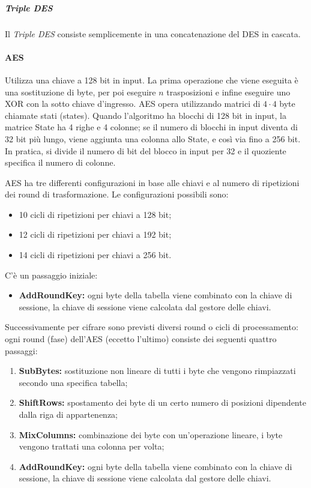 \subparagraph*{Triple DES}

Il \textit{Triple DES} consiste semplicemente in una concatenazione del DES in
cascata.

\paragraph{AES}

Utilizza una chiave a 128 bit in input. La prima operazione che viene eseguita è
una sostituzione di byte, per poi eseguire $n$ trasposizioni e infine eseguire
uno XOR con la sotto chiave d'ingresso.
AES opera utilizzando matrici di $4\cdot4$ byte chiamate stati (states). Quando l'algoritmo ha blocchi di 128 bit in input, la matrice State ha 4 righe e 4 colonne; se il numero di blocchi in input diventa di 32 bit più lungo, viene aggiunta una colonna allo State, e così via fino a 256 bit. In pratica, si divide il numero di bit del blocco in input per 32 e il quoziente specifica il numero di colonne.

AES ha tre differenti configurazioni in base alle chiavi e al numero di
ripetizioni dei round di trasformazione. Le configurazioni possibili sono:
\begin{itemize}
 \item 10 cicli di ripetizioni per chiavi a 128 bit;
 \item 12 cicli di ripetizioni per chiavi a 192 bit;
 \item 14 cicli di ripetizioni per chiavi a 256 bit.
\end{itemize}


C'è un passaggio iniziale:
\begin{itemize}
\item \textbf{AddRoundKey:} ogni byte della tabella viene combinato con la chiave di sessione, la chiave di sessione viene calcolata dal gestore delle chiavi.
\end{itemize}


Successivamente per cifrare sono previsti diversi round o cicli di processamento: ogni round (fase) dell'AES (eccetto l'ultimo) consiste dei seguenti quattro passaggi:

\begin{enumerate}
\item \textbf{SubBytes:} sostituzione non lineare di tutti i byte che vengono rimpiazzati secondo una specifica tabella;
\item \textbf{ShiftRows:} spostamento dei byte di un certo numero di posizioni dipendente dalla riga di appartenenza;
\item \textbf{MixColumns:} combinazione dei byte con un'operazione lineare, i byte vengono trattati una colonna per volta;
\item \textbf{AddRoundKey:} ogni byte della tabella viene combinato con la chiave di sessione, la chiave di sessione viene calcolata dal gestore delle chiavi.
\end{enumerate}

